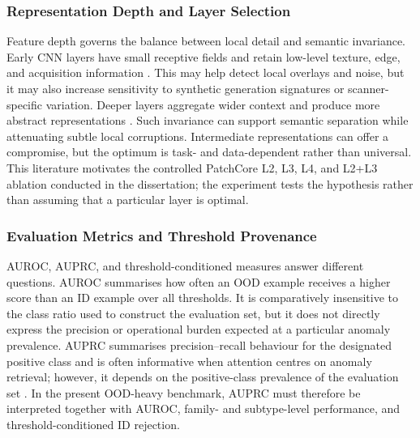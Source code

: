 \documentclass[fleqn,12pt]{olplainarticle}
\begin{document}
\subsubsection{Representation Depth and Layer Selection}

Feature depth governs the balance between local detail and semantic invariance. Early CNN layers have small receptive fields and retain low-level texture, edge, and acquisition information \cite{zeiler2014visualizing}. This may help detect local overlays and noise, but it may also increase sensitivity to synthetic generation signatures or scanner-specific variation. Deeper layers aggregate wider context and produce more abstract representations \cite{yosinski2014transferable}. Such invariance can support semantic separation while attenuating subtle local corruptions. Intermediate representations can offer a compromise, but the optimum is task- and data-dependent rather than universal. This literature motivates the controlled PatchCore L2, L3, L4, and L2+L3 ablation conducted in the dissertation; the experiment tests the hypothesis rather than assuming that a particular layer is optimal.

\subsubsection{Evaluation Metrics and Threshold Provenance}

AUROC, AUPRC, and threshold-conditioned measures answer different questions. AUROC summarises how often an OOD example receives a higher score than an ID example over all thresholds. It is comparatively insensitive to the class ratio used to construct the evaluation set, but it does not directly express the precision or operational burden expected at a particular anomaly prevalence. AUPRC summarises precision--recall behaviour for the designated positive class and is often informative when attention centres on anomaly retrieval; however, it depends on the positive-class prevalence of the evaluation set \cite{saito2015precision}. In the present OOD-heavy benchmark, AUPRC must therefore be interpreted together with AUROC, family- and subtype-level performance, and threshold-conditioned ID rejection.
\end{document}
